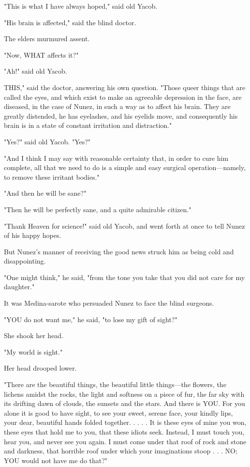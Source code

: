 \documentclass[submission]{sffms}
\begin{document}
"This is what I have always hoped," said old Yacob.

"His brain is affected," said the blind doctor.

The elders murmured assent.

"Now, WHAT affects it?"

"Ah!" said old Yacob.

THIS," said the doctor, answering his own question. "Those queer
things that are called the eyes, and which exist to make an agreeable
depression in the face, are diseased, in the case of Nunez, in such a
way as to affect his brain. They are greatly distended, he has
eyelashes, and his eyelids move, and consequently his brain is in a
state of constant irritation and distraction."

"Yes?" said old Yacob. "Yes?"

"And I think I may say with reasonable certainty that, in order to
cure him complete, all that we need to do is a simple and easy
surgical operation---namely, to remove these irritant bodies."

"And then he will be sane?"

"Then he will be perfectly sane, and a quite admirable citizen."

"Thank Heaven for science!" said old Yacob, and went forth at once to
tell Nunez of his happy hopes.

But Nunez's manner of receiving the good news struck him as being cold
and disappointing.

"One might think," he said, "from the tone you take that you did not
care for my daughter."

It was Medina-sarote who persuaded Nunez to face the blind surgeons.

"YOU do not want me," he said, "to lose my gift of sight?"

She shook her head.

"My world is sight."

Her head drooped lower.

"There are the beautiful things, the beautiful little things---the
flowers, the lichens amidst the rocks, the light and softness on a
piece of fur, the far sky with its drifting dawn of clouds, the
sunsets and the stars. And there is YOU.  For you alone it is good to
have sight, to see your sweet, serene face, your kindly lips, your
dear, beautiful hands folded together. . . . . It is these eyes of
mine you won, these eyes that hold me to you, that these idiots seek.
Instead, I must touch you, hear you, and never see you again. I must
come under that roof of rock and stone and darkness, that horrible
roof under which your imaginations stoop . . . NO; YOU would not have
me do that?"
\end{document}
